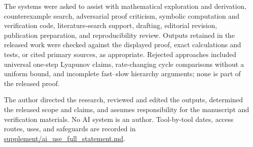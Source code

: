 The systems were asked to assist with mathematical exploration and derivation,
counterexample search, adversarial proof criticism, symbolic computation and
verification code, literature-search support, drafting, editorial revision,
publication preparation, and reproducibility review.  Outputs retained in the
released work were checked against the displayed proof, exact calculations and
tests, or cited primary sources, as appropriate.  Rejected approaches included universal
one-step Lyapunov claims, rate-changing cycle comparisons without a uniform
bound, and incomplete fast--slow hierarchy arguments; none is part of the
released proof.

The author directed the research, reviewed and edited the outputs, determined
the released scope and claims, and assumes responsibility for the manuscript
and verification materials.  No AI system is an author.  Tool-by-tool dates,
access routes, uses, and safeguards are recorded in
\href{https://github.com/AlecKriebel/Math/blob/bimolecular-positive-recurrence-v1.2/bimolecular_positive_recurrence_submission_v1_2/supplement/ai_use_full_statement.md}{supplement/ai\_use\_full\_statement.md}.



